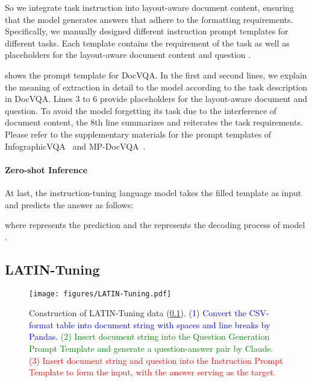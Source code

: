 \documentclass[letterpaper]{article} \usepackage{aaai24_preprint}  \usepackage{times}  \usepackage{helvet}  \usepackage{courier}  \usepackage[hyphens]{url}  \usepackage{graphicx} \urlstyle{rm} \def\UrlFont{\rm}  \usepackage{natbib}  \usepackage{caption} \frenchspacing  \setlength{\pdfpagewidth}{8.5in} \setlength{\pdfpageheight}{11in} \usepackage{algorithm}
\begin{document}
So we integrate task instruction into layout-aware document content, ensuring that the model generates answers that adhere to the formatting requirements.
Specifically, we manually designed different instruction prompt templates for different tasks.
Each template  contains the requirement of the task as well as placeholders for the layout-aware document content  and question .

 shows the prompt template for DocVQA.
In the first and second lines, we explain the meaning of extraction in detail to the model according to the task description in DocVQA.
Lines 3 to 6 provide placeholders for the layout-aware document and question.
To avoid the model forgetting its task due to the interference of document content, the 8th line summarizes and reiterates the task requirements.
Please refer to the supplementary materials for the prompt templates of InfographicVQA~\cite{mathewInfographicVQA2021} and MP-DocVQA~\cite{titoMulti-PageDocVQAHi-VT52023}.


\paragraph{Zero-shot Inference}
At last, the instruction-tuning language model  takes the filled template  as input and predicts the answer as follows:

where  represents the prediction and the  represents the decoding process of model . 

\subsection{LATIN-Tuning}
\label{sec:latin-tuning}

\begin{figure}[t]
\centering
\small
\texttt{[image: figures/LATIN-Tuning.pdf]}
\caption{
Construction of LATIN-Tuning data (\cref{sec:latin-tuning}).
\textcolor{blue}{
(1) Convert the CSV-format table into document string with spaces and line breaks by Pandas.
}
\textcolor{green}{
(2) Insert document string into the Question Generation Prompt Template and generate a question-answer pair by Claude.
}
\textcolor{red}{
(3) Insert document string and question into the Instruction Prompt Template to form the input, with the answer serving as the target.
}
}
\label{fig:latin-tuning}
\end{figure}
\end{document}
